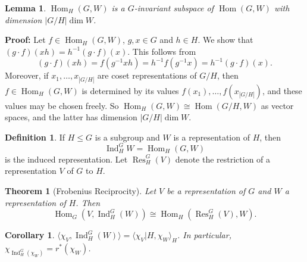 \documentclass[12pt]{article}
\DeclareMathOperator{\Hom}{Hom}
\DeclareMathOperator{\Ind}{Ind}
\DeclareMathOperator{\Res}{Res}
\newtheorem{theorem}{Theorem}[section]
\newtheorem{corollary}{Corollary}[section]
\newtheorem{lemma}{Lemma}[section]
\theoremstyle{definition}
\newtheorem{definition}{Definition}[section]
\theoremstyle{remark}
\begin{document}
\begin{lemma}
	$\Hom_H(G, W)$ is a $G$-invariant subspace of $\Hom(G, W)$ with dimension $|G/H| \dim W$.
\end{lemma}

\begin{adjustbox}{minipage = \columnwidth - 25.5pt, margin=1em, frame=1pt, margin=0em}
	\textbf{Proof:} Let $f \in \Hom_H(G, W)$, $g, x \in G$ and $h \in H$. We show that $(g \cdot f)(xh) = h^{-1}(g \cdot f)(x)$. This follows from
	\[
		(g \cdot f)(xh) = f(g^{-1}xh) = h^{-1}f(g^{-1}x) = h^{-1}(g \cdot f)(x)
	.\]
	Moreover, if $x_1, \ldots, x_{|G/H|}$ are coset representations of $G/H$, then $f \in \Hom_H(G, W)$ is determined by its values $f(x_1), \ldots, f(x_{|G/H|})$, and these values may be chosen freely. So $\Hom_H(G, W) \cong \Hom(G/H, W)$ as vector spaces, and the latter has dimension $|G/H| \dim W$.
\end{adjustbox}

\begin{definition}
	If $H \leq G$ is a subgroup and $W$ is a representation of $H$, then
	\[
		\Ind_{H}^{G}W = \Hom_H(G, W)
	\]
	is the induced representation. Let $\Res_H^{G}(V)$ denote the restriction of a representation $V$ of $G$ to $H$.
\end{definition}

\begin{theorem}[Frobenius Reciprocity]
	Let $V$ be a representation of $G$ and $W$ a representation of $H$. Then
	\[
		\Hom_G(V, \Ind_H^{G}(W)) \cong \Hom_H(\Res_{H}^{G}(V), W)
	.\]
\end{theorem}

\begin{corollary}
	$\langle \chi_V, \Ind_{H}^{G}(W) \rangle = \langle \chi_V|H, \chi_W \rangle_H$. In particular, $\chi_{\Ind_H^{G}(\chi_W)} = r^{\ast}(\chi_W)$.
\end{corollary}



\newpage

\printindex
\end{document}
